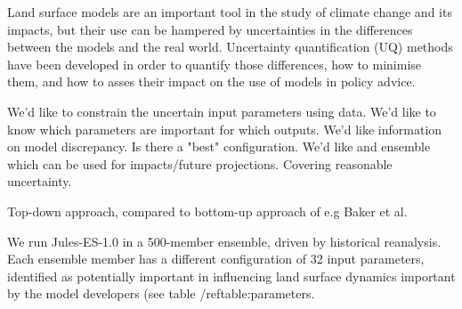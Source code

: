 \documentclass[gmd, manuscript]{copernicus}
\begin{document}
Land surface models are an important tool in the study of climate change and its impacts, but their use can be hampered by uncertainties in the differences between the models and the real world. Uncertainty quantification (UQ) methods have been developed in order to quantify those differences, how to minimise them, and how to asses their impact on the use of models in policy advice.

We'd like to constrain the uncertain input parameters using data.
We'd like to know which parameters are important for which outputs.
We'd like information on model discrepancy. Is there a "best" configuration.
We'd like and ensemble which can be used for impacts/future projections. Covering reasonable uncertainty.


Top-down approach, compared to bottom-up approach of e.g Baker et al.

We run Jules-ES-1.0 in a 500-member ensemble, driven by historical reanalysis. Each ensemble member has a different configuration of 32 input parameters, identified as potentially important in influencing land surface dynamics important by the model developers (see table /ref{table:parameters}.
\end{document}
